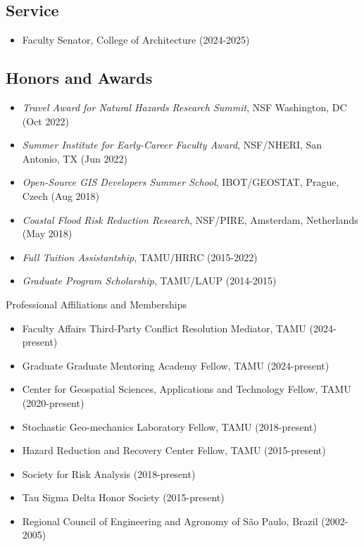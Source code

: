 \documentclass[11pt,oneside]{article}
\begin{document}
\subsection*{Service}
\begin{itemize}[leftmargin=20pt]
\item Faculty Senator, College of Architecture (2024-2025)
\end{itemize}

\subsection*{Honors and Awards}
\begin{itemize}[leftmargin=20pt]
\item \emph{Travel Award for Natural Hazards Research Summit}, NSF Washington, DC (Oct 2022)
\item \emph{Summer Institute for Early-Career Faculty Award}, NSF/NHERI, San Antonio, TX (Jun 2022)
\item \emph{Open-Source GIS Developers Summer School}, IBOT/GEOSTAT, Prague, Czech (Aug 2018)
\item \emph{Coastal Flood Risk Reduction Research}, NSF/PIRE, Amsterdam, Netherlands (May 2018)
\item \emph{Full Tuition Assistantship}, TAMU/HRRC (2015-2022)
\item \emph{Graduate Program Scholarship}, TAMU/LAUP (2014-2015)
\end{itemize}

\vspace{3pt}

{Professional Affiliations and Memberships}
\begin{itemize}[leftmargin=20pt]
\item Faculty Affairs Third-Party Conflict Resolution Mediator, TAMU (2024-present)
\item Graduate Graduate Mentoring Academy Fellow, TAMU (2024-present)
\item Center for Geospatial Sciences, Applications and Technology Fellow, TAMU (2020-present)
\item Stochastic Geo-mechanics Laboratory Fellow, TAMU (2018-present)
\item Hazard Reduction and Recovery Center Fellow, TAMU (2015-present)
\item Society for Risk Analysis (2018-present)
\item Tau Sigma Delta Honor Society (2015-present)
\item Regional Council of Engineering and Agronomy of São Paulo, Brazil (2002-2005)
\end{itemize}
 
\end{document}
